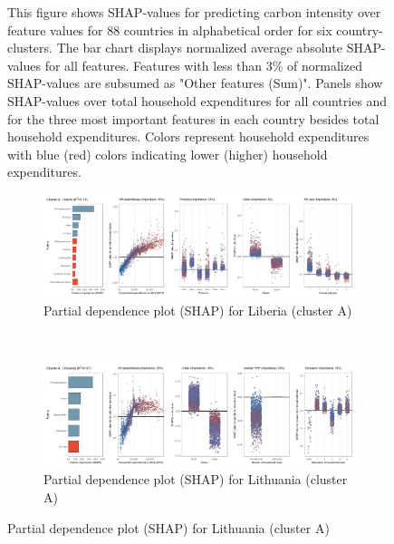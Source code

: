 \begin{figure}[ht!]
    \begin{subcaption2}
     This figure shows SHAP-values for predicting carbon intensity over feature values for 88 countries in alphabetical order for six country-clusters. The bar chart displays normalized average absolute SHAP-values for all features. Features with less than 3\% of normalized SHAP-values are subsumed as "Other features (Sum)". Panels show SHAP-values over total household expenditures for all countries and for the three most important features in each country besides total household expenditures. Colors represent household expenditures with blue (red) colors indicating lower (higher) household expenditures.
     \end{subcaption2}
\end{figure}

\begin{figure}[ht!]\ContinuedFloat
    \centering
   \begin{subfigure}[b]{\textwidth}      
         \centering
         \caption{Partial dependence plot (SHAP) for Liberia (cluster A)}
         \label{fig:5b_LBR}
         \includegraphics[width=\textwidth]{Figure 5b/Figure_5b_LBR} 
         \end{subfigure}
    \\
    \vspace{0.5cm}
    \begin{subfigure}[b]{\textwidth}
         \centering
         \caption{Partial dependence plot (SHAP) for Lithuania (cluster A)}
         \label{fig:5b_LTU}
         \includegraphics[width=\textwidth]{Figure 5b/Figure_5b_LTU}
         \end{subfigure}

\end{figure}
